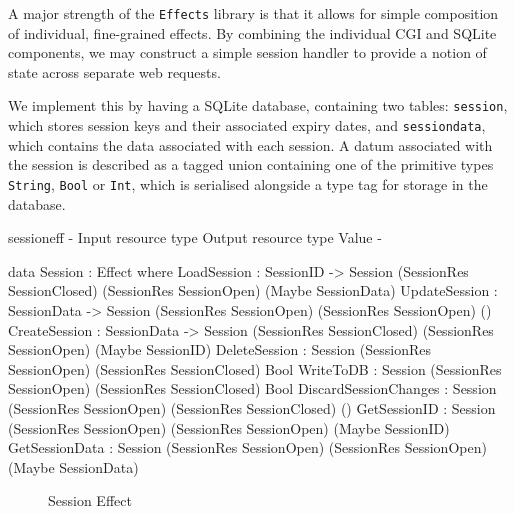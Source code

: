 A major strength of the \texttt{Effects} library is that it allows for simple composition of individual, fine-grained effects. By combining the individual CGI and SQLite components, we may construct a simple session handler to provide a notion of state across separate web requests. 

We implement this by having a SQLite database, containing two tables: \texttt{session}, which stores session keys and their associated expiry dates, and \texttt{sessiondata}, which contains the data associated with each session. A datum associated with the session is described as a tagged union containing one of the primitive types \texttt{String}, \texttt{Bool} or \texttt{Int}, which is serialised alongside a type tag for storage in the database.

\begin{SaveVerbatim}{sessioneff}
{-                        { Input resource type }            { Output resource type }   { Value }        -}

data Session : Effect where
  LoadSession           : SessionID -> 
                          Session (SessionRes SessionClosed) (SessionRes SessionOpen)   (Maybe SessionData)
  UpdateSession         : SessionData -> 
                          Session (SessionRes SessionOpen)   (SessionRes SessionOpen)   ()
  CreateSession         : SessionData -> 
                          Session (SessionRes SessionClosed) (SessionRes SessionOpen)   (Maybe SessionID)
  DeleteSession         : Session (SessionRes SessionOpen)   (SessionRes SessionClosed) Bool 
  WriteToDB             : Session (SessionRes SessionOpen)   (SessionRes SessionClosed) Bool
  DiscardSessionChanges : Session (SessionRes SessionOpen)   (SessionRes SessionClosed) ()
  GetSessionID          : Session (SessionRes SessionOpen)   (SessionRes SessionOpen)   (Maybe SessionID)
  GetSessionData        : Session (SessionRes SessionOpen)   (SessionRes SessionOpen)   (Maybe SessionData)
\end{SaveVerbatim}

\begin{figure*}[t]
\begin{center}
\end{center}
\caption{Session Effect}
\label{fig:sessioneffect}
\end{figure*}

